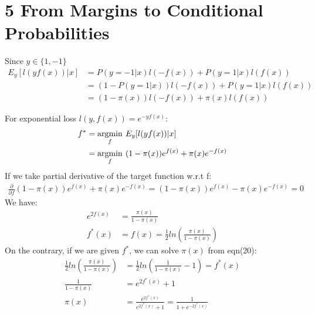 \documentclass{article}
\newenvironment{problem}[2][$\bullet$]{\begin{trivlist}\large
		\item[\hskip \labelsep {\bfseries #1}\hskip \labelsep {\bfseries #2.}]}  {\end{trivlist}}
\begin{document}
\section{5 From Margins to Conditional Probabilities}
\begin{problem}{5.1}
\end{problem}
Since $y\in\{1,-1\}$
\begin{align}
E_y[l(yf(x))|x] &= P(y = -1|x)l(-f(x)) + P(y = 1|x)l(f(x))\\
&= (1- P(y = 1|x))l(-f(x)) + P(y = 1|x)l(f(x))\\
&= (1- \pi(x))l(-f(x)) + \pi(x)l(f(x))
\end{align}

\begin{problem}{5.2}
\end{problem}
For exponential loss $l(y,f(x)) = e^{-yf(x)}$:
\begin{align}
f^* &= \underset{f}{\operatorname{arg min}} \hspace{0.05in} E_y[l(yf(x))|x]\\
&= \underset{f}{\operatorname{arg min}} \hspace{0.05in} (1- \pi(x))e^{f(x)} + \pi(x)e^{-f(x)}
\end{align}
If we take partial derivative of the target function w.r.t f:
\begin{align}
\frac{\partial}{\partial f}  (1- \pi(x))e^{f(x)} + \pi(x)e^{-f(x)} = (1- \pi(x))e^{f(x)} - \pi(x)e^{-f(x)} = 0
\end{align}
We have:
\begin{align}
e^{2f(x)} &= \frac{\pi(x)}{1- \pi(x)}\\
f^*(x) &= f(x) = \frac{1}{2} ln(\frac{\pi(x)}{1- \pi(x)})
\end{align}
On the contrary, if we are given $f^*$, we can solve $\pi(x)$ from eqn(20):
\begin{align}
\frac{1}{2} ln(\frac{\pi(x)}{1- \pi(x)}) &= \frac{1}{2} ln(\frac{1}{1- \pi(x)}-1) = f^*(x)\\
\frac{1}{1-\pi(x)} &= e^{2f^*(x)} +1\\
\pi(x) &= \frac{e^{2f^*(x)}}{e^{2f^*(x)} +1} = \frac{1}{1+e^{-2f^*(x)}}\\
\end{align}
\end{document}

